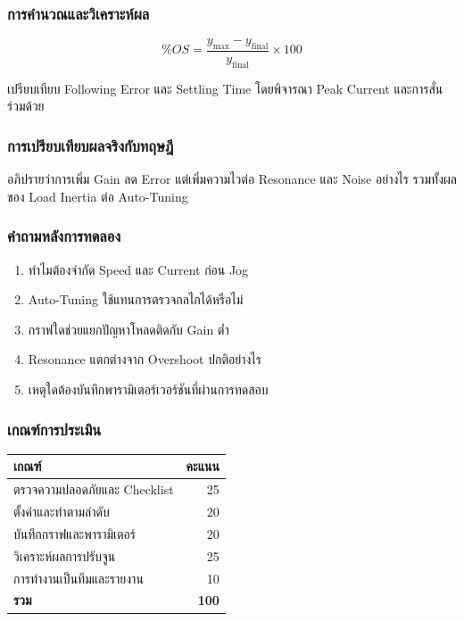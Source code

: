 \subsubsection{การคำนวณและวิเคราะห์ผล}

\[
\%OS=\frac{y_{\max}-y_{\text{final}}}{y_{\text{final}}}\times100
\]

เปรียบเทียบ Following Error และ Settling Time โดยพิจารณา Peak Current และการสั่นร่วมด้วย

\subsubsection{การเปรียบเทียบผลจริงกับทฤษฎี}

อภิปรายว่าการเพิ่ม Gain ลด Error แต่เพิ่มความไวต่อ Resonance และ Noise อย่างไร รวมทั้งผลของ Load Inertia ต่อ Auto-Tuning

\subsubsection{คำถามหลังการทดลอง}

\begin{enumerate}
    \item ทำไมต้องจำกัด Speed และ Current ก่อน Jog
    \item Auto-Tuning ใช้แทนการตรวจกลไกได้หรือไม่
    \item กราฟใดช่วยแยกปัญหาโหลดติดกับ Gain ต่ำ
    \item Resonance แตกต่างจาก Overshoot ปกติอย่างไร
    \item เหตุใดต้องบันทึกพารามิเตอร์เวอร์ชันที่ผ่านการทดสอบ
\end{enumerate}

\subsubsection{เกณฑ์การประเมิน}

\begin{table}[htbp]
    \centering
    \begin{tabular}{l r}
        \hline
        \textbf{เกณฑ์} & \textbf{คะแนน} \\
        \hline
        ตรวจความปลอดภัยและ Checklist & 25 \\
        ตั้งค่าและทำตามลำดับ & 20 \\
        บันทึกกราฟและพารามิเตอร์ & 20 \\
        วิเคราะห์ผลการปรับจูน & 25 \\
        การทำงานเป็นทีมและรายงาน & 10 \\
        \textbf{รวม} & \textbf{100} \\
        \hline
    \end{tabular}
\end{table}

